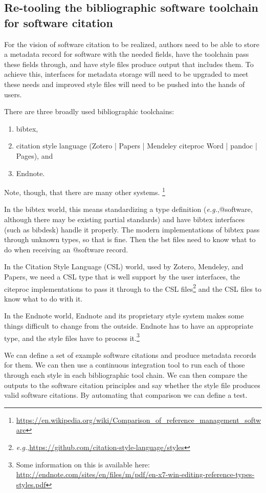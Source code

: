 \documentclass[a4paper,UKenglish]{dagman}
\newcommand{\eg}{\emph{e.g.},\xspace}
\begin{document}
\subsection{Re-tooling the bibliographic software toolchain for software citation}

For the vision of software citation to be realized, authors need to be able to store a metadata record for software with the needed fields, have the toolchain pass these fields through, and have style files produce output that includes them. To achieve this, interfaces for metadata storage will need to be upgraded to meet these needs and improved style files will need to be pushed into the hands of users.

There are three broadly used bibliographic toolchains:
\begin{enumerate}
\item bibtex,
\item citation style language (Zotero | Papers | Mendeley \ra citeproc \ra Word | pandoc | Pages),  and \item Endnote.
\end{enumerate}
Note, though, that there are many other systems.%
\footnote{\url{https://en.wikipedia.org/wiki/Comparison_of_reference_management_software}}

In the bibtex world, this means standardizing a type definition (\eg @software, although there may be existing partial standards) and have bibtex interfaces (such as bibdesk) handle it properly. The modern implementations of bibtex pass through unknown types, so that is fine. Then the bst files need to know what to do when receiving an @software record.

In the Citation Style Language (CSL) world, used by Zotero, Mendeley, and Papers, we need a CSL type that is well support by the user interfaces, the citeproc implementations to pass it through to the CSL files\footnote{\eg \url{https://github.com/citation-style-language/styles}} and the CSL files to know what to do with it.

In the Endnote world, Endnote and its proprietary style system makes some things difficult to change from the outside. Endnote has to have an appropriate type, and the style files have to process it.\footnote{Some information on this is available here:\\ \url{http://endnote.com/sites/en/files/m/pdf/en-x7-win-editing-reference-types-styles.pdf}}

We can define a set of example software citations and produce metadata records for them. We can then use a continuous integration tool to run each of those through each style in each bibliographic tool chain. We can then compare the outputs to the software citation principles and say whether the style file produces valid software citations. By automating that comparison we can define a test.
\end{document}
